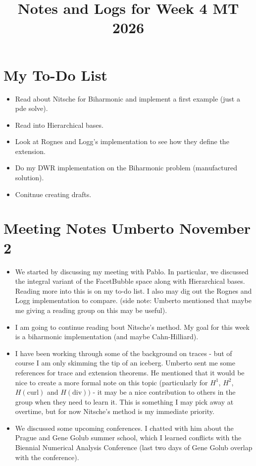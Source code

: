 \documentclass[12pt,a4paper]{article}
\title{\textbf{Notes and Logs for Week 4 MT 2026}}
\author{}
\date{}
\begin{document}
\maketitle

\section{My To-Do List}


\begin{itemize}
    \item Read about Nitsche for Biharmonic and implement a first example (just a pde solve). 
    \item Read into Hierarchical bases. 
    \item Look at Rognes and Logg's implementation to see how they define the extension. 
    \item Do my DWR implementation on the Biharmonic problem (manufactured solution). 
    \item Conitnue creating drafts. 
\end{itemize}

\section{Meeting Notes Umberto November 2}

\begin{itemize}

\item We started by discussing my meeting with Pablo. In particular, we discussed the integral variant of the FacetBubble space along with Hierarchical bases. Reading more into this is on my to-do list. I also may dig out the Rognes and Logg implementation to compare. (side note: Umberto mentioned that maybe me giving a reading group on this may be useful). 



\item I am going to continue reading bout Nitsche's method. My goal for this week is a biharmonic implementation (and maybe Cahn-Hilliard). 



\item I have been working through some of the background on traces - but of course I am only skimming the tip of an iceberg. Umberto sent me some references for trace and extension theorems. He mentioned that it would be nice to create a more formal note on this topic (particularly for $H^1$, $H^2$, $H(\text{curl})$ and $H(\text{div}))$ - it may be a nice contribution to others in the group when they need to learn it. This is something I may pick away at overtime, but for now Nitsche's method is my immediate priority.



\item We discussed some upcoming conferences. I chatted with him about the Prague and Gene Golub summer school, which I learned conflicts with the Biennial Numerical Analysis Conference (last two days of Gene Golub overlap with the conference).

\end{itemize}
\end{document}
